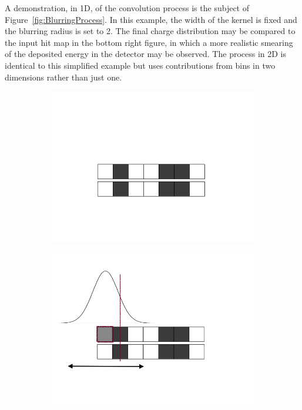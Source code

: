 A demonstration, in 1D, of the convolution process is the subject of Figure~\ref{fig:BlurringProcess}.  In this example, the width of the kernel is fixed and the blurring radius is set to 2.  The final charge distribution may be compared to the input hit map in the bottom right figure, in which a more realistic smearing of the deposited energy in the detector may be observed.  The process in 2D is identical to this simplified example but uses contributions from bins in two dimensions rather than just one.

\begin{figure}
  \centering
  \begin{subfigure}[t]{0.3\linewidth}
    \centering
    \includegraphics[width=\textwidth]{blurring1.png}
  \end{subfigure}
  \hfill
  \begin{subfigure}[t]{0.3\linewidth}
    \centering
    \includegraphics[width=\textwidth]{blurring2.png}

\end{subfigure}
\end{figure}

